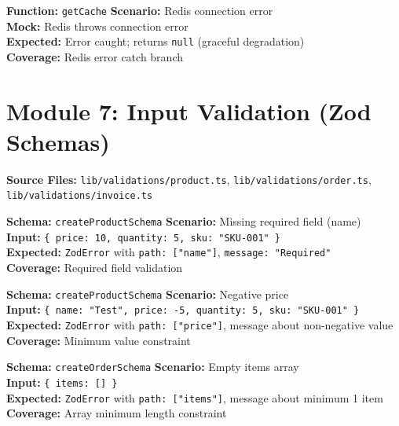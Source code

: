 \documentclass[12pt,a4paper]{report}
\newcommand{\ptwo}{\textbf{\color{p2orange}P2}}
\newcommand{\pthree}{\textbf{\color{p3blue}P3}}
\begin{document}
\begin{tcolorbox}[testbox,title={CACHE-002 \hfill \pthree}]
\textbf{Function:} \texttt{getCache} \quad \textbf{Scenario:} Redis connection error \\
\textbf{Mock:} Redis throws connection error \\
\textbf{Expected:} Error caught; returns \texttt{null} (graceful degradation) \\
\textbf{Coverage:} Redis error catch branch
\end{tcolorbox}

\section{Module 7: Input Validation (Zod Schemas)}

\textbf{Source Files:} \texttt{lib/validations/product.ts}, \texttt{lib/validations/order.ts}, \texttt{lib/validations/invoice.ts}

\begin{tcolorbox}[testbox,title={ZOD-001 \hfill \ptwo}]
\textbf{Schema:} \texttt{createProductSchema} \quad \textbf{Scenario:} Missing required field (name) \\
\textbf{Input:} \texttt{\{ price: 10, quantity: 5, sku: "SKU-001" \}} \\
\textbf{Expected:} \texttt{ZodError} with \texttt{path: ["name"]}, \texttt{message: "Required"} \\
\textbf{Coverage:} Required field validation
\end{tcolorbox}

\begin{tcolorbox}[testbox,title={ZOD-002 \hfill \ptwo}]
\textbf{Schema:} \texttt{createProductSchema} \quad \textbf{Scenario:} Negative price \\
\textbf{Input:} \texttt{\{ name: "Test", price: -5, quantity: 5, sku: "SKU-001" \}} \\
\textbf{Expected:} \texttt{ZodError} with \texttt{path: ["price"]}, message about non-negative value \\
\textbf{Coverage:} Minimum value constraint
\end{tcolorbox}

\begin{tcolorbox}[testbox,title={ZOD-003 \hfill \ptwo}]
\textbf{Schema:} \texttt{createOrderSchema} \quad \textbf{Scenario:} Empty items array \\
\textbf{Input:} \texttt{\{ items: [] \}} \\
\textbf{Expected:} \texttt{ZodError} with \texttt{path: ["items"]}, message about minimum 1 item \\
\textbf{Coverage:} Array minimum length constraint
\end{tcolorbox}
\end{document}
